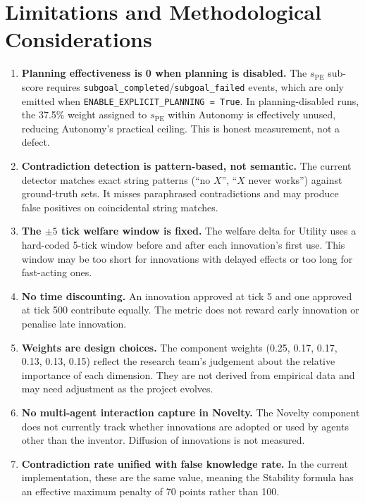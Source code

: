 \documentclass[a4paper, 11pt]{article}
\begin{document}
\section{Limitations and Methodological Considerations}

\begin{enumerate}
    \item \textbf{Planning effectiveness is 0 when planning is disabled.} The $s_{\text{PE}}$ sub-score requires \texttt{subgoal\_completed}/\texttt{subgoal\_failed} events, which are only emitted when \texttt{ENABLE\_EXPLICIT\_PLANNING = True}. In planning-disabled runs, the 37.5\% weight assigned to $s_{\text{PE}}$ within Autonomy is effectively unused, reducing Autonomy's practical ceiling. This is honest measurement, not a defect.

    \item \textbf{Contradiction detection is pattern-based, not semantic.} The current detector matches exact string patterns (``no $X$'', ``$X$ never works'') against ground-truth sets. It misses paraphrased contradictions and may produce false positives on coincidental string matches.

    \item \textbf{The $\pm 5$ tick welfare window is fixed.} The welfare delta for Utility uses a hard-coded 5-tick window before and after each innovation's first use. This window may be too short for innovations with delayed effects or too long for fast-acting ones.

    \item \textbf{No time discounting.} An innovation approved at tick 5 and one approved at tick 500 contribute equally. The metric does not reward early innovation or penalise late innovation.

    \item \textbf{Weights are design choices.} The component weights (0.25, 0.17, 0.17, 0.13, 0.13, 0.15) reflect the research team's judgement about the relative importance of each dimension. They are not derived from empirical data and may need adjustment as the project evolves.

    \item \textbf{No multi-agent interaction capture in Novelty.} The Novelty component does not currently track whether innovations are adopted or used by agents other than the inventor. Diffusion of innovations is not measured.

    \item \textbf{Contradiction rate unified with false knowledge rate.} In the current implementation, these are the same value, meaning the Stability formula has an effective maximum penalty of 70 points rather than 100.
\end{enumerate}
\end{document}
